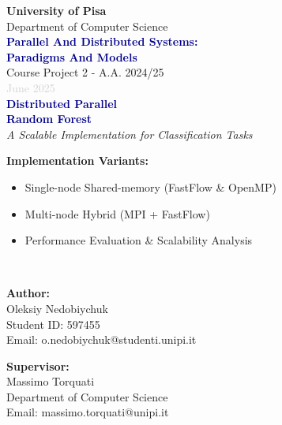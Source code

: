 \documentclass[12pt,a4paper]{article}
\begin{document}
\begin{titlepage}
    \centering
    
    
    {\Large\textbf{University of Pisa}}\\[0.5cm]
    {\large Department of Computer Science}\\[2cm]
    
    {\Large\textcolor{darkblue}{\textbf{Parallel And Distributed Systems: \\[3mm] Paradigms And Models}}}\\[0.5cm]
    {\large Course Project 2 - A.A. 2024/25}\\[0.5cm]
    {\large\textcolor{lightgray}{June 2025}}\\[2cm]
    {\Huge\textcolor{darkblue}{\textbf{Distributed Parallel}}}\\[0.5cm]
    {\Huge\textcolor{darkblue}{\textbf{Random Forest}}}\\[1cm]
    {\Large\textit{A Scalable Implementation for Classification Tasks}}\\[3cm]
    
    \begin{minipage}{0.8\textwidth}
        \centering
        \textbf{Implementation Variants:}\\[0.5cm]
        \begin{itemize}
            \item Single-node Shared-memory (FastFlow \& OpenMP)
            \item Multi-node Hybrid (MPI + FastFlow)
            \item Performance Evaluation \& Scalability Analysis
        \end{itemize}
    \end{minipage}\\[3cm]
    
    \begin{minipage}{0.45\textwidth}
        \centering
        \textbf{Author:}\\
        Oleksiy Nedobiychuk\\
        Student ID: 597455\\
        Email: o.nedobiychuk@studenti.unipi.it
    \end{minipage}
    \hfill
    \begin{minipage}{0.45\textwidth}
        \centering
        \textbf{Supervisor:}\\
        Massimo Torquati\\
        Department of Computer Science\\
        Email: massimo.torquati@unipi.it
    \end{minipage}\\[2cm]
    
    
\end{titlepage}
\end{document}
